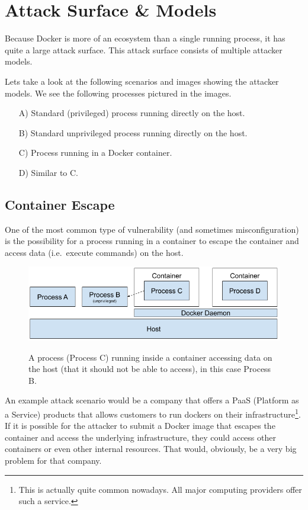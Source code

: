 \section{Attack Surface \& Models}

Because Docker is more of an ecosystem than a single running process, it has quite a large attack surface. This attack surface consists of multiple attacker models.

\hfill

Lets take a look at the following scenarios and images showing the attacker models.
We see the following processes pictured in the images.
\begin{enumerate}
    \item[A)] Standard (privileged) process running directly on the host.
    \item[B)] Standard unprivileged process running directly on the host.
    \item[C)] Process running in a Docker container.
    \item[D)] Similar to C.
\end{enumerate}

\subsection{Container Escape}
One of the most common type of vulnerability (and sometimes misconfiguration) is the possibility for a process running in a container to escape the container and access data (i.e.\ execute commands) on the host.
\begin{figure}[ht]
    \centering
    \includegraphics[width=.9\linewidth]{resources/images/attack-scenario-3.png}
    \caption{}\label{fig:container-escape}
    \medskip
    \small
    A process (Process C) running inside a container accessing data on the host (that it should not be able to access), in this case Process B.
\end{figure}

\hfill

An example attack scenario would be a company that offers a PaaS (Platform as a Service) products that allows customers to run dockers on their infrastructure\footnote{This is actually quite common nowadays. All major computing providers offer such a service.}. If it is possible for the attacker to submit a Docker image that escapes the container and access the underlying infrastructure, they could access other containers or even other internal resources. That would, obviously, be a very big problem for that company.

